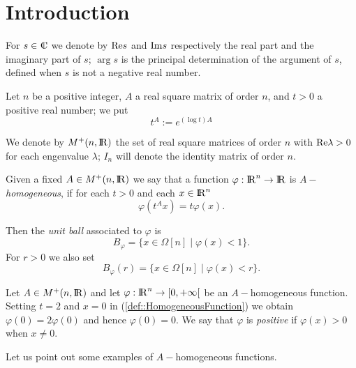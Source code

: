 \documentclass[12pt,a4paper]{amsart}
\begin{document}
\section{\label{section:SectionIntro}Introduction}
For ${s}\in{{\rm\kern.37em\vrule height1.4ex width.05em depth-.011em\kern-.37em C}}$ we denote by ${\mathop{\rm Re}\nolimits}{s}$ and ${\mathop{\rm Im}\nolimits}{s}$
respectively the real part and the imaginary part of ${s}$;
$\arg{s}$ is the principal determination of the
argument of ${s}$,
defined when ${s}$ is not a negative real number.

Let ${n}$ be a positive integer,
${A}$ a real square matrix of order ${n}$,
and ${t}>0$ a positive real number;
we put
\begin{equation}\nonumber
	{t}^{A}:=e^{(\log t){A}}
\end{equation}

We denote by
${{{M}^+}({n},{{\rm I\kern-.185em R}})}$
the set of real square matrices of order ${n}$
with ${\mathop{\rm Re}\nolimits}\lambda>0$ for each engenvalue $\lambda$;
$I_{n}$ will denote the identity matrix of order ${n}$.

Given a fixed ${A}\in{{{M}^+}({n},{{\rm I\kern-.185em R}})}$
we say that a function ${\varphi}:{{\rm I\kern-.185em R}}^{n}\to{{\rm I\kern-.185em R}}$
is ${A}-$\emph{homogeneous},
if for each ${t}>0$
and each ${x}\in{{\rm I\kern-.185em R}}^{n}$
\begin{equation}\label{def::HomogeneousFunction}
	{\varphi}({t}^{A}{x})={t}{\varphi}({x}).
\end{equation}

Then the \emph{unit ball} associated to ${\varphi}$ is
\begin{equation}\nonumber
	{B}_{\varphi}=
		\bigl\{
			{x}\in{\Omega}[{n}]\mid{\varphi}({x})<1
		\bigr\}.
\end{equation}
For ${r}>0$ we also set
\begin{equation}\nonumber
	{B}_{\varphi}({r})=
		\bigl\{
			{x}\in{\Omega}[{n}]\mid{\varphi}({x})<{r}
		\bigr\}.
\end{equation}

Let ${A}\in{{{M}^+}({n},{{\rm I\kern-.185em R}})}$ and
let ${\varphi}:{{\rm I\kern-.185em R}}^{n}\to[0,+\infty[$
be an ${A}-$homogeneous function.
Setting ${t}=2$ and ${x}=0$ in (\ref{def::HomogeneousFunction})
we obtain ${\varphi}(0)=2{\varphi}(0)$ and hence ${\varphi}(0)=0$.
We say that ${\varphi}$ is \emph{positive}
if ${\varphi}({x})>0$ when ${x}\neq0$.

Let us point out some examples of ${A}-$homogeneous functions.
\end{document}
